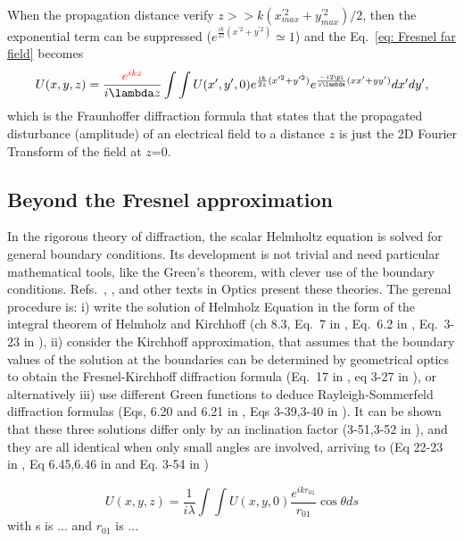 \documentclass{iucr}              %
\newcommand{\inred}[1]{{\color{red}#1}}
\begin{document}
When the propagation distance verify $z >>k (x^{\prime 2}_{max} + y^{\prime 2}_{max})/2 $, then the exponential term can be suppressed 
($e^{\frac{i k}{2 z} (x^{\prime 2} + y^{\prime 2} )} \simeq 1$) and the Eq.~\ref{eq: Fresnel far field} becomes
\begin{equation}\label{eq: fraunhoffer}
U(x,y,z) = \frac{\inred{e^{i k z}}}{i \lambda z}
\int\int U(x',y',0) e^{ \frac{i k}{2 z} (x'^2 + y'^2) } 
e^{ \frac{-i 2 \pi}{z \lambda} (x x' + y y') } dx' dy',
\end{equation}
which is the Fraunhoffer diffraction formula that states that the propagated disturbance (amplitude) of an electrical field to a distance $z$ is just the 2D Fourier Transform of the field at $z$=0. 

\subsection{Beyond the Fresnel approximation}

In the rigorous theory of diffraction, the scalar Helmholtz equation is solved for general boundary conditions. Its development is not trivial and need particular mathematical tools, like the Green's theorem, with clever use of the boundary conditions. Refs.~\cite{bornwolf}, \cite{nieto}, \cite{goodmanfourier} and other texts in Optics present these theories. The gerenal procedure is: i) write the solution of Helmholz Equation in the form of the integral theorem of Helmholz and Kirchhoff (ch 8.3, Eq.~7 in \cite{bornwolf}, Eq.~6.2 in \cite{nieto}, Eq.~3-23 in \cite{goodmanfourier} ), ii) consider the Kirchhoff approximation, that assumes that the boundary values of the solution at the boundaries can be determined by geometrical optics to obtain the Fresnel-Kirchhoff diffraction formula (Eq.~17 in \cite{bornwolf}, eq 3-27 in \cite{goodmanfourier}), or alternatively iii) use different Green functions to deduce Rayleigh-Sommerfeld diffraction formulas (Eqs, 6.20 and 6.21 in \cite{nieto}, Eqs 3-39,3-40 in \cite{goodmanfourier}). It can be shown  that these three solutions differ only by an inclination factor (3-51,3-52 in \cite{goodmanfourier}), and they are all identical when only small angles are involved, arriving to (Eq 22-23 in \cite{bornwolf}, Eq 6.45,6.46 in \cite{nieto} and Eq. 3-54 in \cite{goodmanfourier})

\begin{equation}\label{eq: Huygens}
 U(x,y,z) = \frac{1}{i \lambda} \int \int U(x,y,0) \frac{e^{i k r_{01}}}{r_{01}} \cos \theta ds
\end{equation}
with s is ... and $r_{01}$ is ...
% 
\end{document}
